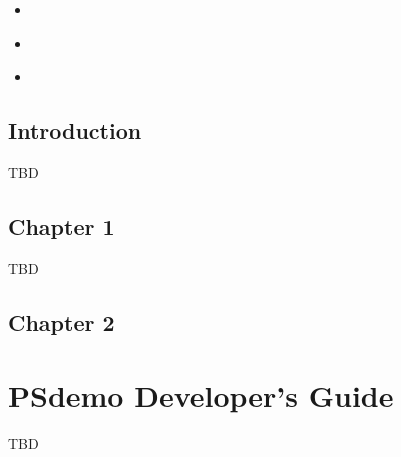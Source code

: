 \documentclass[letterpaper,10pt,english]{sphinxmanual}
\begin{document}
\begin{sphinxShadowBox}
\begin{itemize}
\item {} 
\label{\detokenize{get-started:id1}}{\hyperref[\detokenize{get-started:introduction}]{}}

\item {} 
\label{\detokenize{get-started:id2}}{\hyperref[\detokenize{get-started:chapter-1}]{}}

\item {} 
\label{\detokenize{get-started:id3}}{\hyperref[\detokenize{get-started:chapter-2}]{}}

\end{itemize}
\end{sphinxShadowBox}


\section{Introduction}
\label{\detokenize{get-started:introduction}}
TBD


\section{Chapter 1}
\label{\detokenize{get-started:chapter-1}}
TBD


\section{Chapter 2}
\label{\detokenize{get-started:chapter-2}}

\chapter{PSdemo Developer’s Guide}
\label{\detokenize{dev-guide:product-name-developer-s-guide}}\label{\detokenize{dev-guide:doc-dev-guide}}\label{\detokenize{dev-guide::doc}}
TBD
\end{document}
